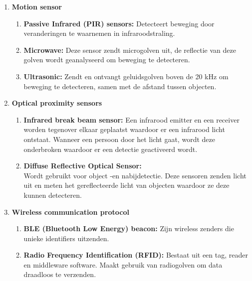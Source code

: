 \begin{enumerate}
    \item \textbf{Motion sensor}
    \begin{enumerate}
        \item \textbf{Passive Infrared (PIR) sensors:} Detecteert beweging door veranderingen te waarnemen in infraroodstraling.
        \item \textbf{Microwave:} Deze sensor zendt microgolven uit, de reflectie van deze golven wordt geanalyseerd om beweging te detecteren.
        \item \textbf{Ultrasonic:} Zendt en ontvangt geluidsgolven boven de 20 kHz om beweging te detecteren, samen met de afstand tussen objecten.
    \end{enumerate}
    
    
    \item \textbf{Optical proximity sensors}
    \begin{enumerate}
        \item \textbf{Infrared break beam sensor:} Een infrarood emitter en een receiver worden tegenover elkaar geplaatst waardoor er een infrarood licht ontstaat. Wanneer een persoon door het licht gaat, wordt deze onderbroken waardoor er een detectie geactiveerd wordt.
        \item \textbf{Diffuse Reflective Optical Sensor:} \\ Wordt gebruikt voor object -en nabijdetectie. Deze sensoren zenden licht uit en meten het gereflecteerde licht van objecten waardoor ze deze kunnen detecteren.
    \end{enumerate}
    
    \item \textbf{Wireless communication protocol}
    \begin{enumerate}
        \item \textbf{BLE (Bluetooth Low Energy) beacon:} Zijn wireless zenders die unieke identifiers uitzenden.
        \item \textbf{Radio Frequency Identification (RFID):} Bestaat uit een tag, reader en middleware software. Maakt gebruik van radiogolven om data draadloos te verzenden.
    \end{enumerate}
    

\end{enumerate}
